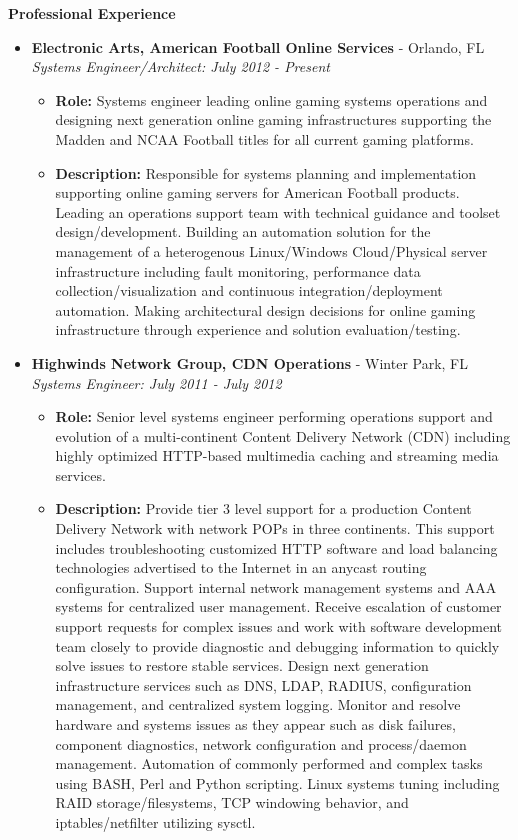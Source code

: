 \documentclass[10pt,oneside]{article}
\newenvironment{ressection}[1]{
	\vspace{4pt}
	\textbf{\selectfont\normalsize#1}
	\begin{itemize}
	\vspace{3pt}
}{
	\end{itemize}
}
\newcommand{\ressubitem}[1]{
	\vspace{-1pt}
	\item \begin{flushleft} #1 \end{flushleft}
}
\newcommand{\resbigitem}[3]{
	\vspace{-5pt}
	\item
	\textbf{#1} - #2 \\
	\textit{#3}
}
\newenvironment{ressubsec}[3]{
	\resbigitem{#1}{#2}{#3}
	\vspace{-2pt}
	\begin{itemize}
}{
	\end{itemize}
}
\begin{document}

\begin{ressection}{Professional Experience}

	\begin{ressubsec}{Electronic Arts, American Football Online Services}{Orlando, FL}{Systems Engineer/Architect: July 2012 - Present}

		\ressubitem{\textbf{Role:} Systems engineer leading online gaming systems operations and designing next generation online gaming infrastructures supporting the Madden and NCAA Football titles for all current gaming platforms.}

		\ressubitem{\textbf{Description:} Responsible for systems planning and implementation supporting online gaming servers for American Football products. Leading an operations support team with technical guidance and toolset design/development. Building an automation solution for the management of a heterogenous Linux/Windows Cloud/Physical server infrastructure including fault monitoring, performance data collection/visualization and continuous integration/deployment automation. Making architectural design decisions for online gaming infrastructure through experience and solution evaluation/testing.}

	\end{ressubsec}
	
	\begin{ressubsec}{Highwinds Network Group, CDN Operations}{Winter Park, FL}{Systems Engineer: July 2011 - July 2012}

		\ressubitem{\textbf{Role:} Senior level systems engineer performing operations support and evolution of a multi-continent Content Delivery Network (CDN) including highly optimized HTTP-based multimedia caching and streaming media services.}

		\ressubitem{\textbf{Description:} Provide tier 3 level support for a production Content Delivery Network with network POPs in three continents.  This support includes troubleshooting customized HTTP software and load balancing technologies advertised to the Internet in an anycast routing configuration.  Support internal network management systems and AAA systems for centralized user management. Receive escalation of customer support requests for complex issues and work with software development team closely to provide diagnostic and debugging information to quickly solve issues to restore stable services.  Design next generation infrastructure services such as DNS, LDAP, RADIUS, configuration management, and centralized system logging. Monitor and resolve hardware and systems issues as they appear such as disk failures, component diagnostics, network configuration and process/daemon management. Automation of commonly performed and complex tasks using BASH, Perl and Python scripting. Linux systems tuning including RAID storage/filesystems, TCP windowing behavior, and iptables/netfilter utilizing sysctl.}


\end{ressubsec}
\end{ressection}
\end{document}
